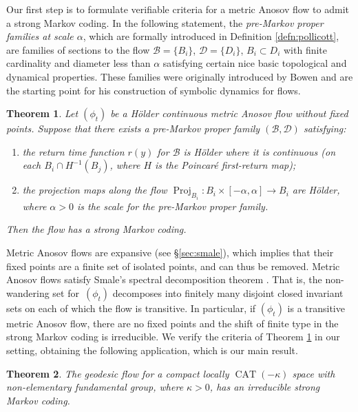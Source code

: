 \documentclass[10pt]{amsart}
\let\mathcal\mathscr
\newtheorem{thmx}{Theorem}
\theoremstyle{definition}
\numberwithin{equation}{section}
\DeclareMathOperator{\CAT}{CAT}
\DeclareMathOperator{\Proj}{Proj}
\newcommand\DDD{\mathcal D}
\newcommand\BBB{\mathcal B}
\begin{document}
Our first step is to formulate verifiable criteria for a metric Anosov flow to admit a strong Markov coding. In the following statement, the \emph{pre-Markov proper families at scale $\alpha$}, which are formally introduced in Definition \ref{defn:pollicott}, are families of sections to the flow $\BBB=\{B_i\}$, $\DDD=\{D_i\}$, $B_i \subset D_i$ with finite cardinality and diameter less than $\alpha$ satisfying certain nice basic topological and dynamical properties. These families were originally introduced by Bowen and are the starting point for his construction of symbolic dynamics for flows.
\begin{thmx} \label{t.usefulversion}
Let $(\phi_t)$ be a Hölder continuous metric Anosov flow without fixed points. Suppose that there exists a pre-Markov proper family $(\BBB, \DDD)$ satisfying:
\begin{enumerate}
\item\label{t.usefulversion1} the return time function $r(y)$ for $\BBB$ is Hölder where it is continuous (\ie on each $B_i \cap H^{-1}(B_j)$, where $H$ is the Poincaré first-return map);

\item\label{t.usefulversion2} the projection maps along the flow $\Proj_{B_{i}}: B_i \times [-\alpha, \alpha] \to B_i$ are Hölder, where $\alpha>0$ is the scale for the pre-Markov proper family.
\end{enumerate}
Then the flow has a strong Markov coding.
\end{thmx}
Metric Anosov flows are expansive (see \S \ref{sec:smale}), which implies that their fixed points are a finite set of isolated points, and can thus be removed. Metric Anosov flows satisfy Smale's spectral decomposition theorem \cite{pollicott}. That is, the non-wandering set for~$(\phi_t)$ decomposes into finitely many disjoint closed invariant sets on each of which the flow is transitive. In particular, if $(\phi_t)$ is a transitive metric Anosov flow, there are no fixed points and the shift of finite type in the strong Markov coding is irreducible. We verify the criteria of Theorem \ref{t.usefulversion} in our setting, obtaining the following application, which is our main result.


\begin{thmx} \label{t.main}
The geodesic flow for a compact locally $\CAT(-\kappa)$ space with non-elementary fundamental group, where $\kappa>0$, has an irreducible strong Markov coding.
\end{thmx}
\end{document}
